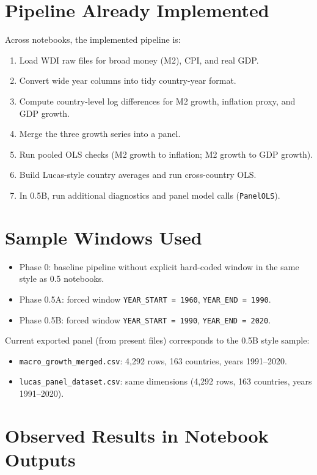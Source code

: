 \documentclass[11pt]{article}
\begin{document}
\section{Pipeline Already Implemented}
Across notebooks, the implemented pipeline is:
\begin{enumerate}
\item Load WDI raw files for broad money (M2), CPI, and real GDP.
\item Convert wide year columns into tidy country-year format.
\item Compute country-level log differences for M2 growth, inflation proxy, and GDP growth.
\item Merge the three growth series into a panel.
\item Run pooled OLS checks (M2 growth to inflation; M2 growth to GDP growth).
\item Build Lucas-style country averages and run cross-country OLS.
\item In 0.5B, run additional diagnostics and panel model calls (\texttt{PanelOLS}).
\end{enumerate}

\section{Sample Windows Used}
\begin{itemize}
\item Phase 0: baseline pipeline without explicit hard-coded window in the same style as 0.5 notebooks.
\item Phase 0.5A: forced window \texttt{YEAR\_START = 1960}, \texttt{YEAR\_END = 1990}.
\item Phase 0.5B: forced window \texttt{YEAR\_START = 1990}, \texttt{YEAR\_END = 2020}.
\end{itemize}

Current exported panel (from present files) corresponds to the 0.5B style sample:
\begin{itemize}
\item \texttt{macro\_growth\_merged.csv}: 4,292 rows, 163 countries, years 1991--2020.
\item \texttt{lucas\_panel\_dataset.csv}: same dimensions (4,292 rows, 163 countries, years 1991--2020).
\end{itemize}

\section{Observed Results in Notebook Outputs}
\end{document}
